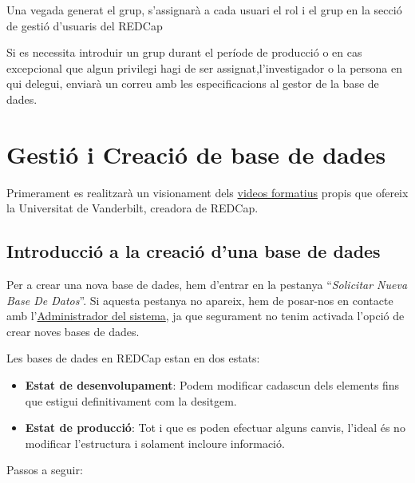 \documentclass[
]{article}
\providecommand{\tightlist}{%
  \setlength{\itemsep}{0pt}\setlength{\parskip}{0pt}}
\begin{document}
Una vegada generat el grup, s'assignarà a cada usuari el rol i el grup en la secció de gestió d'usuaris del REDCap

Si es necessita introduir un grup durant el període de producció o en cas excepcional que algun privilegi hagi de ser assignat,l'investigador o la persona en qui delegui, enviarà un correu amb les especificacions al gestor de la base de dades.

\hypertarget{gestiuxf3-i-creaciuxf3-de-base-de-dades}{%
\section{\texorpdfstring{\textbf{Gestió i Creació de base de dades}}{Gestió i Creació de base de dades}}\label{gestiuxf3-i-creaciuxf3-de-base-de-dades}}

Primerament es realitzarà un visionament dels \href{https://servirredcap.vhir.org/redcap/index.php?action=training}{videos formatius} propis que ofereix la Universitat de Vanderbilt, creadora de REDCap.

\hypertarget{en15}{%
\subsection{\texorpdfstring{\textbf{Introducció a la creació d'una base de dades}}{Introducció a la creació d'una base de dades}}\label{en15}}

Per a crear una nova base de dades, hem d'entrar en la pestanya ``\emph{Solicitar Nueva Base De Datos}''. Si aquesta pestanya no apareix, hem de posar-nos en contacte amb l'\href{mailto:uebsol@vhir.org?subject=Sol·licitar\%20nova\%20base\%20de\%20dades\%20RedCAP}{Administrador del sistema}, ja que segurament no tenim activada l'opció de crear noves bases de dades.

Les bases de dades en REDCap estan en dos estats:

\begin{itemize}
\tightlist
\item
  \textbf{Estat de desenvolupament}: Podem modificar cadascun dels elements fins que estigui definitivament com la desitgem.
\item
  \textbf{Estat de producció}: Tot i que es poden efectuar alguns canvis, l'ideal és no modificar l'estructura i solament incloure informació.
\end{itemize}

Passos a seguir:
\end{document}
